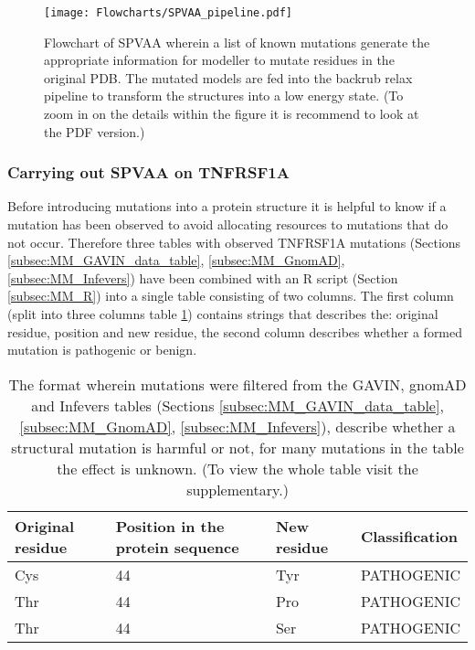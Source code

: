 	
	\begin{figure}[!ht]
		\centering
		\texttt{[image: Flowcharts/SPVAA\_pipeline.pdf]}
		\caption[Flowchart SPVAA pipeline]{Flowchart of SPVAA wherein a list of known mutations generate the appropriate information for modeller to mutate residues in the original PDB. The mutated models are fed into the backrub relax pipeline to transform the structures into a low energy state. (To zoom in on the details within the figure it is recommend to look at the PDF version.)}
	\end{figure}
	\newpage
	
	\subsubsection{Carrying out SPVAA on TNFRSF1A}
	Before introducing mutations into a protein structure it is helpful to know if a mutation has been observed to avoid allocating resources to mutations that do not occur. Therefore three tables with observed TNFRSF1A mutations (Sections \ref{subsec:MM_GAVIN_data_table}, \ref{subsec:MM_GnomAD}, \ref{subsec:MM_Infevers}) have been combined with an R script (Section \ref{subsec:MM_R}) into a single table consisting of two columns. The first column (split into three columns table \ref{table:Res_Filtered_Mutations}) contains strings that describes the: original residue, position and new residue, the second column describes whether a formed mutation is pathogenic or benign. 
	\begin{table}[ht]
		\begin{tabular}{ l | l | l | l}
			Original residue & Position in the protein sequence & New residue & Classification\\ \hline
			Cys & 44 & Tyr & PATHOGENIC\\
			Thr & 44 & Pro & PATHOGENIC\\
			Thr & 44 & Ser & PATHOGENIC\\
		\end{tabular}
		\caption[Sample from the combined observed TNFRSF1A mutations table]{The format wherein mutations were filtered from the GAVIN, gnomAD and Infevers tables (Sections \ref{subsec:MM_GAVIN_data_table},  \ref{subsec:MM_GnomAD}, \ref{subsec:MM_Infevers}),  describe whether a structural mutation is harmful or not, for many mutations in the table the effect is unknown. (To view the whole table visit the supplementary.)}
		\label{table:Res_Filtered_Mutations}
	\end{table}
	
